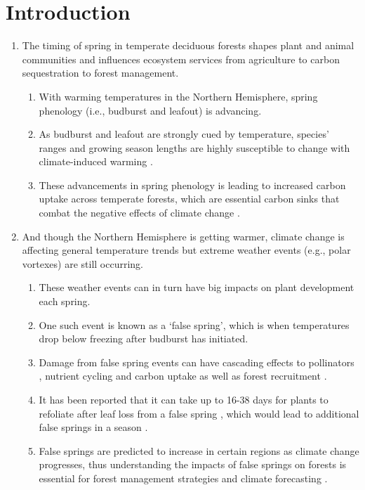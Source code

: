 \documentclass{article}\usepackage[]{graphicx}\usepackage[]{color}
\begin{document}
\section*{Introduction}
\begin{enumerate}
\item The timing of spring in temperate deciduous forests shapes plant and animal communities and influences ecosystem services from agriculture to carbon sequestration to forest management. 
  \begin{enumerate} 
  \item With warming temperatures in the Northern Hemisphere, spring phenology (i.e., budburst and leafout) is advancing.
  \item As budburst and leafout are strongly cued by temperature, species' ranges and growing season lengths are highly susceptible to change with climate-induced warming \citep{Chuine2001}. 
  \item These advancements in spring phenology is leading to increased carbon uptake across temperate forests, which are essential carbon sinks that combat the negative effects of climate change \citep{Keenan2014}.
  \end{enumerate}
  
\item And though the Northern Hemisphere is getting warmer, climate change is affecting general temperature trends but extreme weather events (e.g., polar vortexes) are still occurring. 
  \begin{enumerate}
  \item These weather events can in turn have big impacts on plant development each spring. 
  \item One such event is known as a `false spring', which is when temperatures drop below freezing \citep[][i.e., below -2.2$^{\circ}$C]{Schwartz2002} after budburst has initiated.
  \item Damage from false spring events can have cascading effects to pollinators \citep{Boggs2012, Pardee2017}, nutrient cycling and carbon uptake as well as forest recruitment \citep{Hufkens2012, Klosterman2018, Richardson2013}.
  \item It has been reported that it can take up to 16-38 days for plants to refoliate after leaf loss from a false spring \citep{Augspurger2009, Augspurger2013, Gu2008, Menzel2015}, which would lead to additional false springs in a season \citep{Augspurger2009}.
  \item False springs are predicted to increase in certain regions as climate change progresses, thus understanding the impacts of false springs on forests is essential for forest management strategies and climate forecasting \citep{OBrien2019}.
  \end{enumerate}
  

\end{enumerate}
\end{document}
